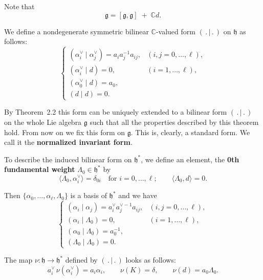 \documentclass[12pt]{article}
\begin{document}
Note that
\[
    \mathfrak{g} = [\mathfrak{g},\mathfrak{g}] \;+\; \mathbb{C}d.
\]

We define a nondegenerate symmetric bilinear $\mathbb{C}$-valued form $(\,.\,|\,.\,)$
on $\mathfrak{h}$ as follows:
\begin{equation}
    \label{eq:6.2.1}
    \begin{cases}
        (\alpha_i^\vee \mid \alpha_j^\vee) = a_i a_j^{-1} a_{ij}, & (i,j = 0,\dots,\ell), \\[6pt]
        (\alpha_i^\vee \mid d) = 0,                               & (i=1,\dots,\ell),     \\[6pt]
        (\alpha_0^\vee \mid d) = a_0,                                                     \\[6pt]
        (d \mid d) = 0.
    \end{cases}
\end{equation}

By Theorem~2.2 this form can be uniquely extended to a bilinear form
$(\,.\,|\,.\,)$ on the whole Lie algebra $\mathfrak{g}$ such that all the properties
described by this theorem hold. From now on we fix this form on $\mathfrak{g}$.
This is, clearly, a standard form. We call it the \textbf{normalized invariant form}.

To describe the induced bilinear form on $\mathfrak{h}^*$, we define an element, the \textbf{0th fundamental weight} $\Lambda_0 \in \mathfrak{h}^*$ by
\[
    \langle \Lambda_0, \alpha_i^\vee \rangle = \delta_{0i}
    \quad \text{for } i=0,\dots,\ell;
    \qquad
    \langle \Lambda_0, d \rangle = 0.
\]

Then $\{\alpha_0,\dots,\alpha_\ell,\Lambda_0\}$ is a basis of $\mathfrak{h}^*$ and we have
\begin{equation}
    \label{eq:6.2.2}
    \begin{cases}
        (\alpha_i \mid \alpha_j) = a_i^\vee a_j^{\vee -1} a_{ij}, & (i,j=0,\dots,\ell), \\[6pt]
        (\alpha_i \mid \Lambda_0) = 0,                            & (i=1,\dots,\ell),   \\[6pt]
        (\alpha_0 \mid \Lambda_0) = a_0^{-1},                                           \\[6pt]
        (\Lambda_0 \mid \Lambda_0) = 0.
    \end{cases}
\end{equation}

The map $\nu : \mathfrak{h} \to \mathfrak{h}^*$ defined by $(\,.\,|\,.\,)$ looks as follows:
\begin{equation}
    \label{eq:6.2.3}
    a_i^\vee \, \nu(\alpha_i^\vee) = a_i \alpha_i,
    \qquad
    \nu(K) = \delta,
    \qquad
    \nu(d) = a_0 \Lambda_0.
\end{equation}
\end{document}
